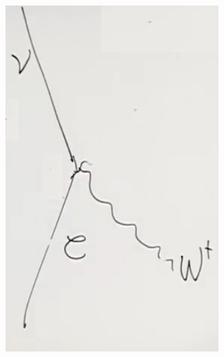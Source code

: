 \documentclass[]{article}
\begin{document}
\begin{figure}[H]
\begin{subfigure}{0.2\textwidth}
		\includegraphics[width=0.9\textwidth]{2-5-W4}
	\end{subfigure}
\end{figure}
\end{document}
